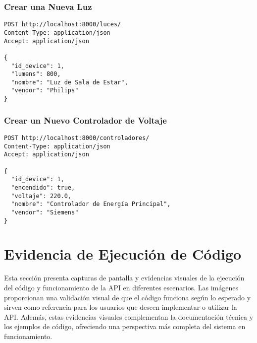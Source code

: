 \documentclass[12pt,letterpaper]{report}
\begin{document}
\subsection{Crear una Nueva Luz}
\begin{lstlisting}
POST http://localhost:8000/luces/
Content-Type: application/json
Accept: application/json

{
  "id_device": 1,
  "lumens": 800,
  "nombre": "Luz de Sala de Estar",
  "vendor": "Philips"
}
\end{lstlisting}

\subsection{Crear un Nuevo Controlador de Voltaje}
\begin{lstlisting}
POST http://localhost:8000/controladores/
Content-Type: application/json
Accept: application/json

{
  "id_device": 1,
  "encendido": true,
  "voltaje": 220.0,
  "nombre": "Controlador de Energía Principal",
  "vendor": "Siemens"
}
\end{lstlisting}

\chapter{Evidencia de Ejecución de Código}


Esta sección presenta capturas de pantalla y evidencias visuales de la ejecución del código y funcionamiento de la API en diferentes escenarios. Las imágenes proporcionan una validación visual de que el código funciona según lo esperado y sirven como referencia para los usuarios que deseen implementar o utilizar la API. Además, estas evidencias visuales complementan la documentación técnica y los ejemplos de código, ofreciendo una perspectiva más completa del sistema en funcionamiento.
\end{document}
